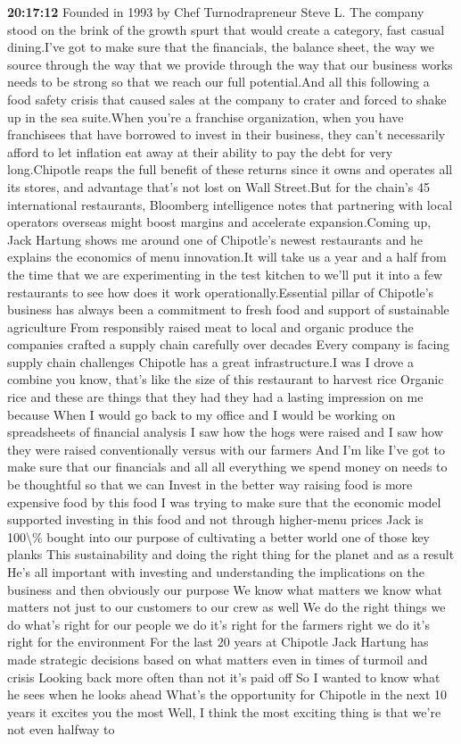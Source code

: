 \documentclass{article}%
\begin{document}
\textbf{20:17:12}%
\newline%
Founded in 1993 by Chef Turnodrapreneur Steve L. The company stood on the brink of the growth spurt that would create a category, fast casual dining.I've got to make sure that the financials, the balance sheet, the way we source through the way that we provide through the way that our business works needs to be strong so that we reach our full potential.And all this following a food safety crisis that caused sales at the company to crater and forced to shake up in the sea suite.When you're a franchise organization, when you have franchisees that have borrowed to invest in their business, they can't necessarily afford to let inflation eat away at their ability to pay the debt for very long.Chipotle reaps the full benefit of these returns since it owns and operates all its stores, and advantage that's not lost on Wall Street.But for the chain's 45 international restaurants, Bloomberg intelligence notes that partnering with local operators overseas might boost margins and accelerate expansion.Coming up, Jack Hartung shows me around one of Chipotle's newest restaurants and he explains the economics of menu innovation.It will take us a year and a half from the time that we are experimenting in the test kitchen to we'll put it into a few restaurants to see how does it work operationally.Essential pillar of Chipotle's business has always been a commitment to fresh food and support of sustainable agriculture From responsibly raised meat to local and organic produce the companies crafted a supply chain carefully over decades Every company is facing supply chain challenges Chipotle has a great infrastructure.I was I drove a combine you know, that's like the size of this restaurant to harvest rice Organic rice and these are things that they had they had a lasting impression on me because When I would go back to my office and I would be working on spreadsheets of financial analysis I saw how the hogs were raised and I saw how they were raised conventionally versus with our farmers And I'm like I've got to make sure that our financials and all all everything we spend money on needs to be thoughtful so that we can Invest in the better way raising food is more expensive food by this food I was trying to make sure that the economic model supported investing in this food and not through higher{-}menu prices Jack is 100\textbackslash{}\% bought into our purpose of cultivating a better world one of those key planks This sustainability and doing the right thing for the planet and as a result He's all important with investing and understanding the implications on the business and then obviously our purpose We know what matters we know what matters not just to our customers to our crew as well We do the right things we do what's right for our people we do it's right for the farmers right we do it's right for the environment For the last 20 years at Chipotle Jack Hartung has made strategic decisions based on what matters even in times of turmoil and crisis Looking back more often than not it's paid off So I wanted to know what he sees when he looks ahead What's the opportunity for Chipotle in the next 10 years it excites you the most Well, I think the most exciting thing is that we're not even halfway to 
\end{document}

